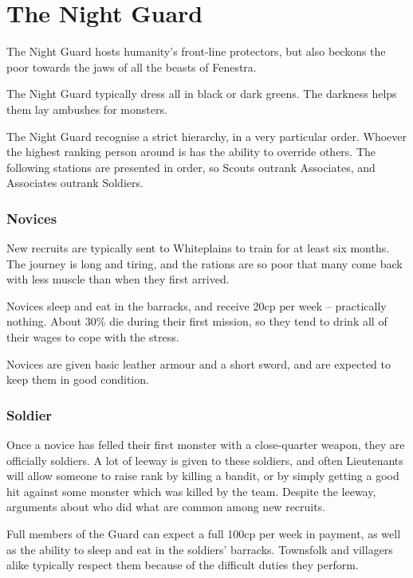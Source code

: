 \chapter{The Night Guard}
\label{nightguard}

\begin{multicols}{2}

\noindent
The Night Guard hosts humanity's front-line protectors, but also beckons the poor towards the jaws of all the beasts of Fenestra.

The Night Guard typically dress all in black or dark greens.
The darkness helps them lay ambushes for monsters.

The Night Guard recognise a strict hierarchy, in a very particular order.
Whoever the highest ranking person around is has the ability to override others.
The following stations are presented in order, so Scouts outrank Associates, and Associates outrank Soldiers.

\subsection{Novices}

New recruits are typically sent to Whiteplains to train for at least six months.
The journey is long and tiring, and the rations are so poor that many come back with less muscle than when they first arrived.

Novices sleep and eat in the barracks, and receive 20cp per week -- practically nothing.
About 30\% die during their first mission, so they tend to drink all of their wages to cope with the stress.

Novices are given basic leather armour and a short sword, and are expected to keep them in good condition.

\subsection{Soldier}

Once a novice has felled their first monster with a close-quarter weapon, they are officially soldiers.
A lot of leeway is given to these soldiers, and often Lieutenants will allow someone to raise rank by killing a bandit, or by simply getting a good hit against some monster which was killed by the team.
Despite the leeway, arguments about who did what are common among new recruits.

Full members of the Guard can expect a full 100cp per week in payment, as well as the ability to sleep and eat in the soldiers' barracks.
Townsfolk and villagers alike typically respect them because of the difficult duties they perform.


\end{multicols}
